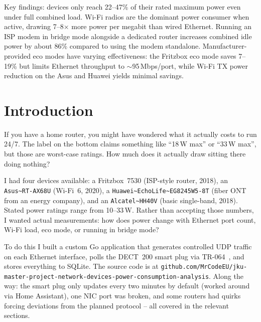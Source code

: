 \documentclass[a4paper,oneside,10pt,ngerman,english]{scrartcl}
\begin{document}
Key findings: devices only reach 22--47\% of their rated maximum power even under full combined load.
Wi-Fi radios are the dominant power consumer when active, drawing 7--8$\times$ more power per megabit than wired Ethernet.
Running an ISP modem in bridge mode alongside a dedicated router increases combined idle power by about 86\% compared to using the modem standalone.
Manufacturer-provided eco modes have varying effectiveness: the Fritzbox eco mode saves 7--19\% but limits Ethernet throughput to $\sim$95\,Mbps/port, while Wi-Fi TX power reduction on the Asus and Huawei yields minimal savings.



\cleardoubleoddpage

\section{Introduction}
\label{sec:introduction}

If you have a home router, you might have wondered what it actually costs to run 24/7. The label on the bottom claims something like ``18\,W max'' or ``33\,W max'', but those are worst-case ratings. How much does it actually draw sitting there doing nothing?

I had four devices available: a Fritzbox~7530 (ISP-style router, 2018), an \verb|Asus~RT-AX68U| (Wi-Fi~6, 2020), a \verb|Huawei~EchoLife~EG8245W5-8T| (fiber ONT from an energy company), and an \verb|Alcatel~HH40V| (basic single-band, 2018). Stated power ratings range from 10--33\,W. Rather than accepting those numbers, I wanted actual measurements: how does power change with Ethernet port count, Wi-Fi load, eco mode, or running in bridge mode?

To do this I built a custom Go application that generates controlled UDP traffic on each Ethernet interface, polls the DECT~200 smart plug via TR-064~\cite{bib:tr064}, and stores everything to SQLite. The source code is at \texttt{github.com/MrCodeEU/jku-master-project-network-devices-power-consumption-analysis}. Along the way: the smart plug only updates every two minutes by default (worked around via Home Assistant), one NIC port was broken, and some routers had quirks forcing deviations from the planned protocol -- all covered in the relevant sections.
\end{document}
